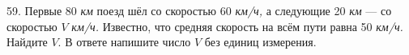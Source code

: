 59. Первые 80 {\it км} поезд шёл со скоростью 60 {\it км/ч,} а следующие 20 {\it км} --- со скоростью $V$ {\it км/ч.} Известно, что средняя скорость на всём пути равна 50 {\it км/ч.} Найдите $V.$ В ответе напишите число $V$ без единиц измерения.\\
